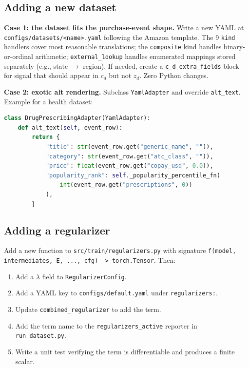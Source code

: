 \documentclass[11pt,a4paper]{article}
\begin{document}
\subsection{Adding a new dataset}

\textbf{Case 1: the dataset fits the purchase-event shape.}
Write a new YAML at \texttt{configs/datasets/<name>.yaml} following
the Amazon template. The 9 \texttt{kind} handlers cover most reasonable
translations; the \texttt{composite} kind handles binary-or-ordinal
arithmetic; \texttt{external\_lookup} handles enumerated mappings
stored separately (e.g., state $\to$ region). If needed,
create a \texttt{c\_d\_extra\_fields} block for signal that should
appear in $c_d$ but not $z_d$. Zero Python changes.

\textbf{Case 2: exotic alt rendering.}
Subclass \texttt{YamlAdapter} and override \texttt{alt\_text}. Example
for a health dataset:

\begin{lstlisting}[language=Python]
class DrugPrescribingAdapter(YamlAdapter):
    def alt_text(self, event_row):
        return {
            "title": str(event_row.get("generic_name", "")),
            "category": str(event_row.get("atc_class", "")),
            "price": float(event_row.get("copay_usd", 0.0)),
            "popularity_rank": self._popularity_percentile_fn(
                int(event_row.get("prescriptions", 0))
            ),
        }
\end{lstlisting}

\subsection{Adding a regularizer}

Add a new function to \texttt{src/train/regularizers.py} with
signature \texttt{f(model, intermediates, E, ..., cfg) -> torch.Tensor}.
Then:
\begin{enumerate}
\item Add a $\lambda$ field to \texttt{RegularizerConfig}.
\item Add a YAML key to \texttt{configs/default.yaml} under
\texttt{regularizers:}.
\item Update \texttt{combined\_regularizer} to add the term.
\item Add the term name to the \texttt{regularizers\_active}
reporter in \texttt{run\_dataset.py}.
\item Write a unit test verifying the term is differentiable and
produces a finite scalar.
\end{enumerate}
\end{document}
